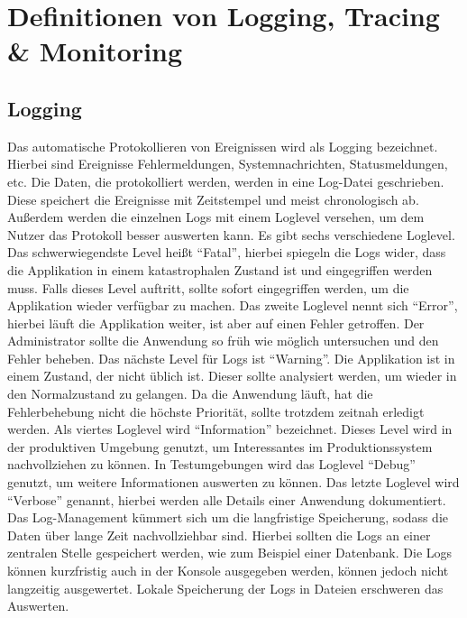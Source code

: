 \chapter{Definitionen von Logging, Tracing {\selectfont \&} Monitoring}\label{ch:definition-von-logging-tracing-&-monitoring}


\section{Logging}\label{sec:logging}
Das automatische Protokollieren von Ereignissen wird als Logging bezeichnet.
Hierbei sind Ereignisse Fehlermeldungen, Systemnachrichten, Statusmeldungen, etc.
Die Daten, die protokolliert werden, werden in eine Log-Datei geschrieben.
Diese speichert die Ereignisse mit Zeitstempel und meist chronologisch ab.
Außerdem werden die einzelnen Logs mit einem Loglevel versehen, um dem Nutzer das Protokoll besser auswerten kann.
Es gibt sechs verschiedene Loglevel.
Das schwerwiegendste Level heißt \enquote{Fatal}, hierbei spiegeln die Logs wider, dass die Applikation in einem katastrophalen Zustand ist und eingegriffen werden muss.
Falls dieses Level auftritt, sollte sofort eingegriffen werden, um die Applikation wieder verfügbar zu machen.
Das zweite Loglevel nennt sich \enquote{Error}, hierbei läuft die Applikation weiter, ist aber auf einen Fehler getroffen.
Der Administrator sollte die Anwendung so früh wie möglich untersuchen und den Fehler beheben.
Das nächste Level für Logs ist \enquote{Warning}.
Die Applikation ist in einem Zustand, der nicht üblich ist.
Dieser sollte analysiert werden, um wieder in den Normalzustand zu gelangen.
Da die Anwendung läuft, hat die Fehlerbehebung nicht die höchste Priorität, sollte trotzdem zeitnah erledigt werden.
Als viertes Loglevel wird \enquote{Information} bezeichnet.
Dieses Level wird in der produktiven Umgebung genutzt, um Interessantes im Produktionssystem nachvollziehen zu können.
In Testumgebungen wird das Loglevel \enquote{Debug} genutzt, um weitere Informationen auswerten zu können.
Das letzte Loglevel wird \enquote{Verbose} genannt, hierbei werden alle Details einer Anwendung dokumentiert.
\\
Das Log-Management kümmert sich um die langfristige Speicherung, sodass die Daten über lange Zeit nachvollziehbar sind.
Hierbei sollten die Logs an einer zentralen Stelle gespeichert werden, wie zum Beispiel einer Datenbank.
Die Logs können kurzfristig auch in der Konsole ausgegeben werden, können jedoch nicht langzeitig ausgewertet.
Lokale Speicherung der Logs in Dateien erschweren das Auswerten.
